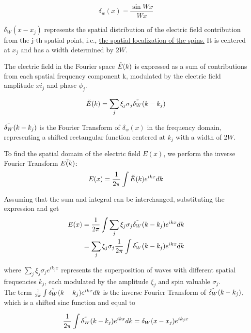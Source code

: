 \begin{equation}
\delta_w(x) = \frac{\sin{Wx}}{Wx}
\end{equation}

$\delta_W(x-x_j)$ represents the spatial distribution of the electric field contribution from the j-th spatial point, i.e., \underline{the spatial localization of the spins.} It is centered at $x_j$ and has a width determined by $2W$.

The electric field in the Fourier space $\Tilde{E}(k)$ is expressed as a sum of contributions from each spatial frequency component k, modulated by the electric field amplitude $xi_j$ and phase $\phi_j$.

\begin{equation}
\tilde{E}(k) = \sum_j {\xi_j \sigma_j \Tilde{\delta_W}(k-k_j)}
\end{equation}

$\Tilde{\delta_W}(k-k_j)$ is the Fourier Transform of $\delta_w(x)$ in the frequency domain, representing a shifted rectangular function centered at $k_j$ with a width of $2W$. 

To find the spatial domain of the electric field $E(x)$, we perform the inverse Fourier Transform $\Tilde{E(k)}$: 
\begin{equation}
    E(x) = \frac{1}{2\pi} \int \Tilde{E}(k) e^{ikx} dk
\end{equation}

Assuming that the sum and integral can be interchanged, substituting the expression and get
\begin{equation}
\begin{aligned}
E(x) &= \frac{1}{2\pi} \int {\sum_j {\xi_j \sigma_j} \Tilde{\delta_W}(k-k_j) e^{ikx}}dk \\
&= \sum_j {\xi_j \sigma_j} \frac{1}{2\pi} \int {\Tilde{\delta_W}(k-k_j) e^{ikx}} dk
\end{aligned}
\end{equation}

where $\sum_j \xi_j \sigma_j e^{ik_jx}$ represents the superposition of waves with different spatial frequencies $k_j$, each modulated by the amplitude $\xi_j$ and spin valuable $\sigma_j$. \\

The term $\frac{1}{2\pi} \int \Tilde{\delta_W}(k-k_j) e^{ikx}dk $ is the inverse Fourier Transform of $\Tilde{\delta_W}(k-k_j)$, which is a shifted sinc function and equal to

\begin{equation}
\frac{1}{2\pi} \int \Tilde{\delta_W}(k-k_j) e^{ikx}dk = \delta_W(x-x_j) e^{ik_jx}
\end{equation}

